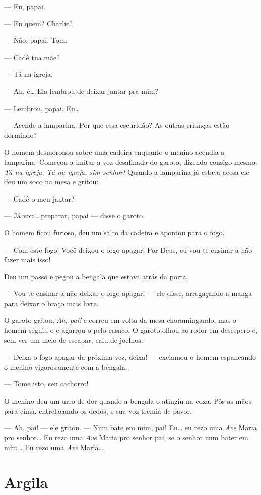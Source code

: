--- Eu, papai.

--- Eu quem? Charlie?

--- Não, papai. Tom.

--- Cadê tua mãe?

--- Tá na igreja.

--- Ah, é\ldots{} Ela lembrou de deixar jantar pra mim?

--- Lembrou, papai. Eu\ldots{}

--- Acende a lamparina. Por que essa escuridão? As outras crianças
estão dormindo?

O homem desmoronou sobre uma cadeira enquanto o menino acendia a
lamparina. Começou a imitar a voz desafinada do garoto, dizendo
consigo mesmo: \textit{Tá na igreja. Tá na igreja, sim senhor!} Quando a
lamparina já estava acesa ele deu um soco na mesa e gritou:

--- Cadê o meu jantar?

--- Já vou\ldots{} preparar, papai --- disse o garoto.

O homem ficou furioso, deu um salto da cadeira e apontou para o fogo.

--- Com este fogo! Você deixou o fogo apagar! Por Deus, eu vou te
ensinar a não fazer mais isso!

Deu um passo e pegou a bengala que estava atrás da porta.

--- Vou te ensinar a não deixar o fogo apagar! --- ele disse,
arregaçando a manga para deixar o braço mais livre.

O garoto gritou, \textit{Ah, pai!} e correu em volta da mesa choramingando,
mas o homem seguiu-o e agarrou-o pelo casaco. O garoto olhou ao redor
em desespero e, sem ver um meio de escapar, caiu de joelhos.

--- Deixa o fogo apagar da próxima vez, deixa! --- exclamou o homem
espancando o menino vigorosamente com a bengala.

--- Tome isto, seu cachorro!

O menino deu um urro de dor quando a bengala o atingiu na coxa. Pôs as
mãos para cima, entrelaçando os dedos, e sua voz tremia de pavor.

--- Ah, pai! --- ele gritou. --- Num bate em mim, pai! Eu\ldots{} eu rezo
uma \textit{Ave} Maria pro senhor\ldots{} Eu rezo uma \textit{Ave} Maria pro senhor pai, se o
senhor num bater em mim\ldots{} Eu rezo uma \textit{Ave} Maria\ldots{}

\chapter{Argila}

